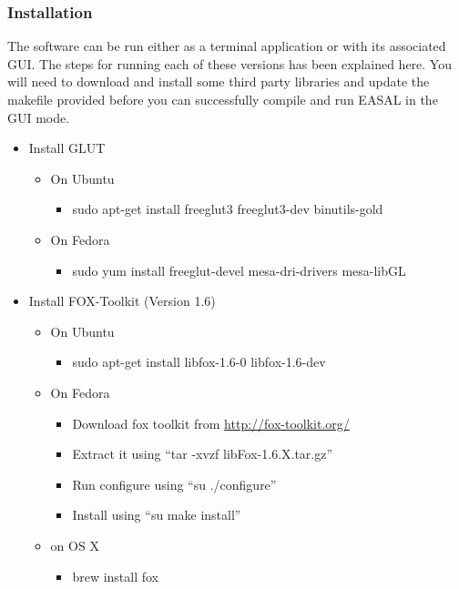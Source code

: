 \documentclass[10pt]{article}
\begin{document}
 
\subsubsection{Installation}
The software can be run either as a terminal application or with its associated
GUI.  The steps for running each of these versions has been explained here. You
will need to download and install some third party libraries and update the
makefile provided before you can successfully compile and run EASAL in the GUI
mode.  

\begin{itemize}
	\item Install GLUT 
	  \begin{itemize}
	  \item On Ubuntu 
	  	  \begin{itemize}
	  	  	\item sudo apt-get install freeglut3 freeglut3-dev binutils-gold
		  \end{itemize}
	 \item On Fedora
	 \begin{itemize}
	  	  \item sudo yum install freeglut-devel mesa-dri-drivers mesa-libGL 
\end{itemize}
	  \end{itemize}
     \item Install FOX-Toolkit (Version 1.6)
	   \begin{itemize}
		   \item On Ubuntu
		   \begin{itemize}
	   	   		\item sudo apt-get install libfox-1.6-0 libfox-1.6-dev
			\end{itemize}
		   \item On Fedora
		   	\begin{itemize}
		   		\item Download fox toolkit from \url{http://fox-toolkit.org/}
				\item Extract it using ``tar -xvzf libFox-1.6.X.tar.gz''
				\item Run configure using ``su ./configure''
				\item Install using ``su make install''
			\end{itemize}
		   \item on OS X
		   	\begin{itemize}
		   		\item brew install fox
		   	\end{itemize}


\end{itemize}
\end{itemize}
\end{document}
